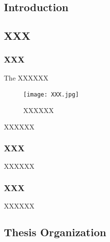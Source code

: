 \documentclass[12pt]{article}
\begin{document}
\begin{CJK*}{UTF8}{bsmi}
\linespread{1.5}
\large


\newpage





\pagestyle{fancy}
\fancyhf{}
\fancyhead[R]{\leftmark}

\renewcommand{\headrulewidth}{3.0pt} 

\fancyfoot[C]{\thepage}


\section{Introduction}


\subsection{XXX}
\subsubsection{XXX}
The XXXXXX


\par
\begin{figure}[H]

\centering
\texttt{[image: XXX.jpg]}
\caption{XXXXXX}
\end{figure}
\par




\par
XXXXXX



\subsubsection{XXX}
XXXXXX


\par

\subsubsection{XXX}
XXXXXX




\par








\subsection{Thesis Organization}


\end{CJK*}
\end{document}
